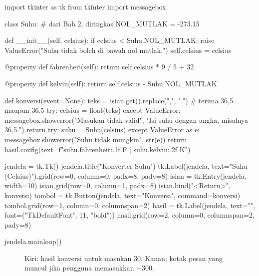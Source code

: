 \begin{kode}
import tkinter as tk
from tkinter import messagebox

class Suhu:                                  # dari Bab 2, diringkas
    NOL_MUTLAK = -273.15

    def __init__(self, celsius):
        if celsius < Suhu.NOL_MUTLAK:
            raise ValueError("Suhu tidak boleh di bawah nol mutlak.")
        self.celsius = celsius

    @property
    def fahrenheit(self):
        return self.celsius * 9 / 5 + 32

    @property
    def kelvin(self):
        return self.celsius - Suhu.NOL_MUTLAK

def konversi(event=None):
    teks = isian.get().replace(",", ".")     # terima 36,5 maupun 36.5
    try:
        celsius = float(teks)
    except ValueError:
        messagebox.showerror("Masukan tidak valid",
                             "Isi suhu dengan angka, misalnya 36,5.")
        return
    try:
        suhu = Suhu(celsius)
    except ValueError as e:
        messagebox.showerror("Suhu tidak mungkin", str(e))
        return
    hasil.config(text=f"{suhu.fahrenheit:.1f} F   |   {suhu.kelvin:.2f} K")

jendela = tk.Tk()
jendela.title("Konverter Suhu")
tk.Label(jendela, text="Suhu (Celsius)").grid(row=0, column=0, padx=8, pady=8)
isian = tk.Entry(jendela, width=10)
isian.grid(row=0, column=1, padx=8)
isian.bind("<Return>", konversi)
tombol = tk.Button(jendela, text="Konversi", command=konversi)
tombol.grid(row=1, column=0, columnspan=2)
hasil = tk.Label(jendela, text="", font=("TkDefaultFont", 11, "bold"))
hasil.grid(row=2, column=0, columnspan=2, pady=8)

jendela.mainloop()
\end{kode}

\begin{figure}[htbp]
\centering
{}
\caption{Kiri: hasil konversi untuk masukan 30. Kanan: kotak pesan yang muncul jika pengguna memasukkan $-300$.}
\end{figure}

